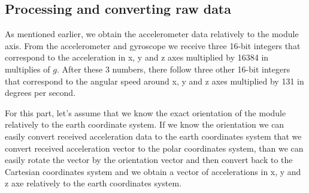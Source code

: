 \documentclass[hidelinks,a4paper]{article}
\begin{document}
\subsection{Processing and converting raw data}
As mentioned earlier, we obtain the accelerometer data relatively to the module axis. From the accelerometer and gyroscope we receive three 16-bit integers that correspond to the acceleration in x, y and z axes multiplied by 16384 in multiplies of $g$. After these 3 numbers, there follow three other 16-bit integers that correspond to the angular speed around x, y and z axes multiplied by 131 in degrees per second.\par
For this part, let's assume that we know the exact orientation of the module relatively to the earth coordinate system. If we know the orientation we can easily convert received acceleration data to the earth coordinates system that we convert received acceleration vector to the polar coordinates system, than we can easily rotate the vector by the orientation vector and then convert back to the Cartesian coordinates system and we obtain a vector of accelerations in x, y and z axe relatively to the earth coordinates system.
\end{document}
